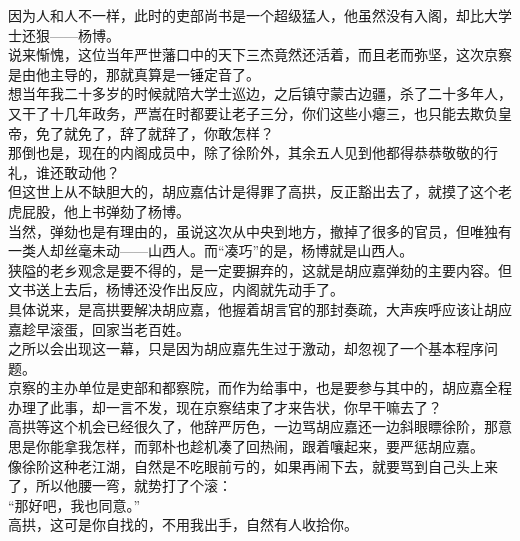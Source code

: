 \begin{multicols}{\theparacolNo}
因为人和人不一样，此时的吏部尚书是一个超级猛人，他虽然没有入阁，却比大学士还狠——杨博。\\

说来惭愧，这位当年严世藩口中的天下三杰竟然还活着，而且老而弥坚，这次京察是由他主导的，那就真算是一锤定音了。\\

想当年我二十多岁的时候就陪大学士巡边，之后镇守蒙古边疆，杀了二十多年人，又干了十几年政务，严嵩在时都要让老子三分，你们这些小瘪三，也只能去欺负皇帝，免了就免了，辞了就辞了，你敢怎样？\\

那倒也是，现在的内阁成员中，除了徐阶外，其余五人见到他都得恭恭敬敬的行礼，谁还敢动他？\\

但这世上从不缺胆大的，胡应嘉估计是得罪了高拱，反正豁出去了，就摸了这个老虎屁股，他上书弹劾了杨博。\\

当然，弹劾也是有理由的，虽说这次从中央到地方，撤掉了很多的官员，但唯独有一类人却丝毫未动——山西人。而“凑巧”的是，杨博就是山西人。\\

狭隘的老乡观念是要不得的，是一定要摒弃的，这就是胡应嘉弹劾的主要内容。但文书送上去后，杨博还没作出反应，内阁就先动手了。\\

具体说来，是高拱要解决胡应嘉，他握着胡言官的那封奏疏，大声疾呼应该让胡应嘉趁早滚蛋，回家当老百姓。\\

之所以会出现这一幕，只是因为胡应嘉先生过于激动，却忽视了一个基本程序问题。\\

京察的主办单位是吏部和都察院，而作为给事中，也是要参与其中的，胡应嘉全程办理了此事，却一言不发，现在京察结束了才来告状，你早干嘛去了？\\

高拱等这个机会已经很久了，他辞严厉色，一边骂胡应嘉还一边斜眼瞟徐阶，那意思是你能拿我怎样，而郭朴也趁机凑了回热闹，跟着嚷起来，要严惩胡应嘉。\\

像徐阶这种老江湖，自然是不吃眼前亏的，如果再闹下去，就要骂到自己头上来了，所以他腰一弯，就势打了个滚：\\

“那好吧，我也同意。”\\

高拱，这可是你自找的，不用我出手，自然有人收拾你。\\


\end{multicols}
